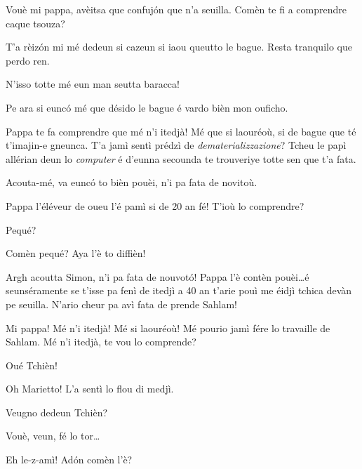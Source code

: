\begin{drama}

\Simonspeaks Vouè mi pappa, avèitsa que confuj\'on que n’a seuilla. Comèn te fi a comprendre caque tsouza?

\Cienspeaks {} T’a rèiz\'on mi mé dedeun si cazeun si iaou queutto le bague. Resta tranquilo que perdo ren.

\Simonspeaks N’isso totte mé eun man seutta baracca!

\Cienspeaks Pe ara si eunc\'o mé que désido le bague é  vardo bièn mon ouficho.

\Simonspeaks Pappa te fa comprendre que mé n'i itedjà! Mé que si laouréoù, si de bague que té t'imajin-e gneunca. T’a jamì sentì prédzì de \textit{dematerializzazione}? Tcheu le papì allérian deun lo \textit{computer} é d’eunna secounda te trouveriye totte sen que t’a fata.

\Cienspeaks Acouta-mé, va eunc\'o to bièn pouèi, n’i pa fata de novitoù.

\Simonspeaks Pappa l’éléveur de oueu l’é pamì si de 20 an fé! T'ioù lo comprendre?

\Cienspeaks Pequé?

\Simonspeaks Comèn pequé? Aya l'è to diffièn!

\Cienspeaks Argh acoutta Simon, n'i pa fata de nouvot\'o! Pappa l’è con\-tèn pouèi\ldots é seunséramente se t’isse pa fenì de itedjì a 40 an t’arie pouì me éidjì tchica devàn pe seuilla. N’ario cheur pa avì fata de prende Sahlam!

\Simonspeaks Mi pappa! Mé n'i itedjà! Mé si laouréoù! Mé pourio jamì fére lo travaille de Sahlam. Mé n'i itedjà, te vou lo comprende?

\scene[-- Marietto]


\Mariettospeaks Oué Tchièn!

\Cienspeaks Oh Marietto!  L’a sentì lo flou di medjì.

\Mariettospeaks Veugno dedeun Tchièn?

\Cienspeaks Vouè, veun, fé lo tor\ldots


\Mariettospeaks Eh le-z-amì! Ad\'on comèn l’è?


\end{drama}
